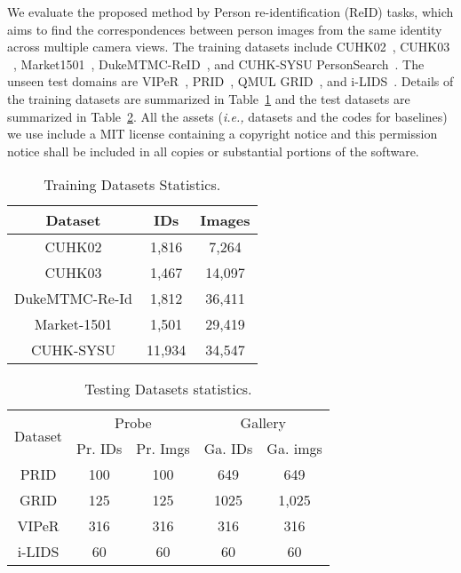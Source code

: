 \documentclass{article} \usepackage{iclr2023_conference,times}
\newcommand{\ie}[0]{\textit{i.e., }}
\begin{document}
We evaluate the proposed method by Person re-identification (ReID) tasks, which aims to find the correspondences between person images from the same identity across multiple camera views. The training datasets include CUHK02~\citep{Li_2013_CVPR}, CUHK03 ~\citep{Li_2014_CVPR}, Market1501~\citep{Zheng_2015_ICCV}, DukeMTMC-ReID~\citep{Zheng_2017_ICCV}, and CUHK-SYSU PersonSearch~\citep{xiao2016end}. The unseen test domains are VIPeR~\citep{viper}, PRID~\citep{prid}, QMUL GRID~\citep{grid}, and i-LIDS~\citep{ilids}. Details of the training datasets are summarized in Table~\ref{tab:traindata} and the test datasets are summarized in Table~\ref{tab:testdata}. All the assets (\ie datasets and the codes for baselines) we use include a MIT license containing a copyright notice and this permission notice shall be included in all copies or substantial portions of the software.

 \begin{table}[]
 \centering
 \caption{Training Datasets Statistics.}\label{tab:traindata}
  \begin{tabular}{ccc}
  \toprule
    Dataset & IDs &Images \\ \hline
    CUHK02& 1,816 & 7,264 \\ 
                      CUHK03& 1,467 & 14,097 \\ 
                   DukeMTMC-Re-Id & 1,812 & 36,411 \\ 
                     Market-1501& 1,501 & 29,419 \\ 
                     CUHK-SYSU& 11,934 & 34,547 \\ \bottomrule
  \end{tabular}
\end{table}
 \begin{table}[]
 \centering
  \caption{Testing Datasets statistics.}\label{tab:testdata}

  \begin{tabular}{c|c|c|c|c}
  \toprule
  \multirow{2}{*}{Dataset} & \multicolumn{2}{c|}{ Probe} & \multicolumn{2}{c}{ Gallery} \\\cline{2-5} 
   &      Pr. IDs&      Pr. Imgs&      Ga. IDs&  Ga. imgs    \\\hline
           PRID&      100& 100     &   649   &  649   \\
           GRID&      125& 125     &  1025    &  1,025   \\
           VIPeR&      316&  316  &  316   &  316  \\
           i-LIDS&      60&60     &     60 &  60   \\\bottomrule
 \end{tabular}
\end{table}
\end{document}
